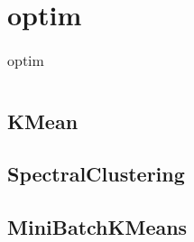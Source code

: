 \chapter{optim\label{optim}}
\begin{table}
    \centering
    \caption{optim}
    \begin{tabular}{lll}
        \hline
        \nameref{KMean} & \nameref{SpectralClustering} & \nameref{MiniBatchKMeans} \\
        \hline
    \end{tabular}
\end{table}
\section{KMean\label{KMean}}
\section{SpectralClustering\label{SpectralClustering}}
\section{MiniBatchKMeans\label{MiniBatchKMeans}}